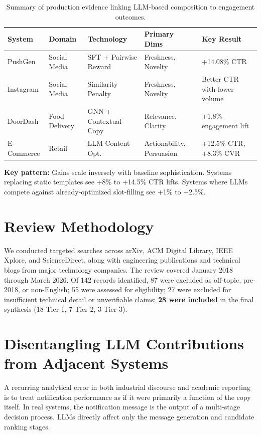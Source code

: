 \documentclass[11pt]{article}
\begin{document}
\begin{table}[h]
\caption{Summary of production evidence linking LLM-based composition to engagement outcomes.}
\label{tab:evidence}
\begin{tabular}{p{2cm}p{2cm}p{3.5cm}p{3cm}p{3cm}}
\toprule
\textbf{System} & \textbf{Domain} & \textbf{Technology} & \textbf{Primary Dims} & \textbf{Key Result} \\
\midrule
PushGen & Social Media & SFT + Pairwise Reward & Freshness, Novelty & +14.08\% CTR \\
Instagram & Social Media & Similarity Penalty & Freshness, Novelty & Better CTR with lower volume \\
DoorDash & Food Delivery & GNN + Contextual Copy & Relevance, Clarity & +1.8\% engagement lift \\
E-Commerce & Retail & LLM Content Opt. & Actionability, Persuasion & +12.5\% CTR, +8.3\% CVR \\
\bottomrule
\end{tabular}
\end{table}

\textbf{Key pattern:} Gains scale inversely with baseline sophistication. Systems replacing static templates see +8\% to +14.5\% CTR lifts. Systems where LLMs compete against already-optimized slot-filling see +1\% to +2.5\%.

\section{Review Methodology}

We conducted targeted searches across arXiv, ACM Digital Library, IEEE Xplore, and ScienceDirect, along with engineering publications and technical blogs from major technology companies. The review covered January 2018 through March 2026. Of 142 records identified, 87 were excluded as off-topic, pre-2018, or non-English; 55 were assessed for eligibility; 27 were excluded for insufficient technical detail or unverifiable claims; \textbf{28 were included} in the final synthesis (18 Tier 1, 7 Tier 2, 3 Tier 3).

\section{Disentangling LLM Contributions from Adjacent Systems}

A recurring analytical error in both industrial discourse and academic reporting is to treat notification performance as if it were primarily a function of the copy itself. In real systems, the notification message is the output of a multi-stage decision process. LLMs directly affect only the message generation and candidate ranking stages.
\end{document}
